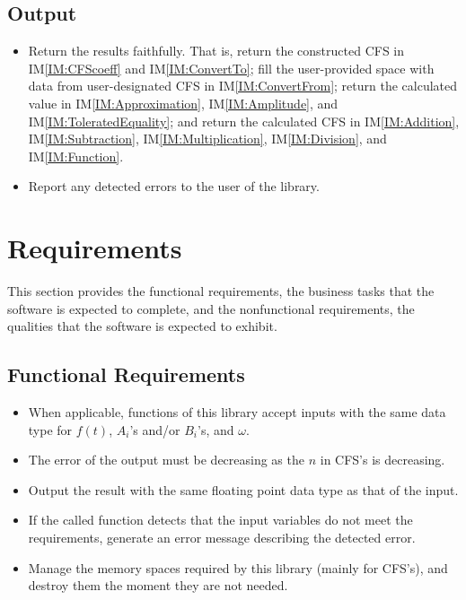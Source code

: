 \documentclass[12pt]{article}
\newcounter{outputnum} %
\newcommand{\iref}[1]{IM\ref{#1}}
\newcounter{reqnum} %
\begin{document}
\subsection{Output} \label{sec_Output}    
\begin{itemize}
\item[O\refstepcounter{outputnum}\theoutputnum \label{Output:Faithful}:] Return
  the results faithfully. That is, return the constructed CFS in
  \iref{IM:CFScoeff} and \iref{IM:ConvertTo}; fill the user-provided space with
  data from user-designated CFS in \iref{IM:ConvertFrom}; return the calculated
  value in \iref{IM:Approximation}, \iref{IM:Amplitude}, and
  \iref{IM:ToleratedEquality}; and return the calculated CFS in
  \iref{IM:Addition}, \iref{IM:Subtraction}, \iref{IM:Multiplication},
  \iref{IM:Division}, and \iref{IM:Function}.
\item[O\refstepcounter{outputnum}\theoutputnum \label{Output:Error}:] 
Report any detected errors to the user of the library.
\end{itemize}
\section{Requirements}\label{Sc:Req}

This section provides the functional requirements, the business tasks that the
software is expected to complete, and the nonfunctional requirements, the
qualities that the software is expected to exhibit.

\subsection{Functional Requirements}

\noindent \begin{itemize}
\newcommand{\ritem}[1]{\item[R\refstepcounter{reqnum}\thereqnum \label{R:#1}:]}
\ritem{InputDataType} 
When applicable, functions of this library accept inputs with the same 
data type for $f(t)$, $A_i$'s and/or $B_i$'s, and $\omega$. 
\ritem{OutputError} 
The error of the output must be decreasing as the $n$ in CFS's is decreasing.
\ritem{OutputDataType} 
Output the result with the same floating point data type as that of the input.
\ritem{ErrorMessage}
If the called function detects that the input variables do not 
meet the requirements, generate an error message describing 
the detected error.
\ritem{Memory} 
Manage the memory spaces required by this library 
(mainly for CFS's), and destroy them the moment they are not needed.

\end{itemize}
\end{document}
